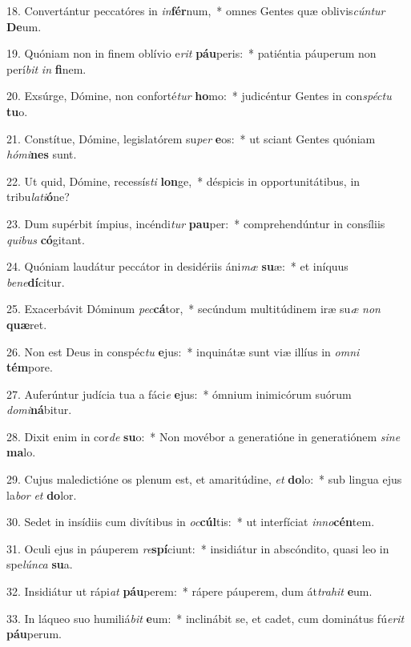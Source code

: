 18. Convertántur peccatóres in \textit{in}\textbf{fér}num,~*  omnes Gentes quæ oblivis\textit{cún}\textit{tur} \textbf{De}um.\

19. Quóniam non in finem oblívio e\textit{rit} \textbf{páu}peris:~*  patiéntia páuperum non perí\textit{bit} \textit{in} \textbf{fi}nem.\

20. Exsúrge, Dómine, non conforté\textit{tur} \textbf{ho}mo:~*  judicéntur Gentes in con\textit{spéc}\textit{tu} \textbf{tu}o.\

21. Constítue, Dómine, legislatórem su\textit{per} \textbf{e}os:~*  ut sciant Gentes quóniam \textit{hó}\textit{mi}\textbf{nes} sunt.\

22. Ut quid, Dómine, recessís\textit{ti} \textbf{lon}ge,~*  déspicis in opportunitátibus, in tribu\textit{la}\textit{ti}\textbf{ó}ne?\

23. Dum supérbit ímpius, incéndi\textit{tur} \textbf{pau}per:~*  comprehendúntur in consíliis \textit{qui}\textit{bus} \textbf{có}gitant.\

24. Quóniam laudátur peccátor in desidériis áni\textit{mæ} \textbf{su}æ:~*  et iníquus \textit{be}\textit{ne}\textbf{dí}citur.\

25. Exacerbávit Dóminum \textit{pec}\textbf{cá}tor,~*  secúndum multitúdinem iræ su\textit{æ} \textit{non} \textbf{quæ}ret.\

26. Non est Deus in conspéc\textit{tu} \textbf{e}jus:~*  inquinátæ sunt viæ illíus in \textit{om}\textit{ni} \textbf{tém}pore.\

27. Auferúntur judícia tua a fáci\textit{e} \textbf{e}jus:~*  ómnium inimicórum suórum \textit{do}\textit{mi}\textbf{ná}bitur.\

28. Dixit enim in cor\textit{de} \textbf{su}o:~*  Non movébor a generatióne in generatiónem \textit{si}\textit{ne} \textbf{ma}lo.\

29. Cujus maledictióne os plenum est, et amaritúdine, \textit{et} \textbf{do}lo:~*  sub lingua ejus la\textit{bor} \textit{et} \textbf{do}lor.\

30. Sedet in insídiis cum divítibus in \textit{oc}\textbf{cúl}tis:~*  ut interfíciat \textit{in}\textit{no}\textbf{cén}tem.\

31. Oculi ejus in páuperem \textit{re}\textbf{spí}ciunt:~*  insidiátur in abscóndito, quasi leo in spe\textit{lún}\textit{ca} \textbf{su}a.\

32. Insidiátur ut rápi\textit{at} \textbf{páu}perem:~*  rápere páuperem, dum át\textit{tra}\textit{hit} \textbf{e}um.\

33. In láqueo suo humiliá\textit{bit} \textbf{e}um:~*  inclinábit se, et cadet, cum dominátus fú\textit{e}\textit{rit} \textbf{páu}perum.\

